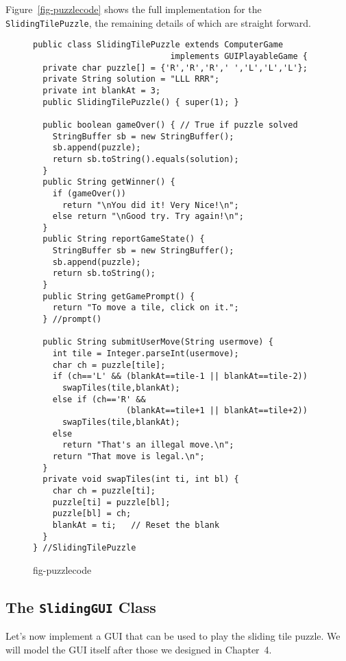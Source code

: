 Figure~\ref{fig-puzzlecode} shows the full implementation for the {\tt
SlidingTilePuzzle}, the remaining details of which are straight forward.

\begin{figure}[h!]
\jjjprogstart
\begin{jjjlisting}
\begin{lstlisting}
public class SlidingTilePuzzle extends ComputerGame 
                            implements GUIPlayableGame {
  private char puzzle[] = {'R','R','R',' ','L','L','L'};
  private String solution = "LLL RRR";
  private int blankAt = 3;
  public SlidingTilePuzzle() { super(1); }

  public boolean gameOver() { // True if puzzle solved
    StringBuffer sb = new StringBuffer();
    sb.append(puzzle);
    return sb.toString().equals(solution);    
  } 
  public String getWinner() {   
    if (gameOver())
      return "\nYou did it! Very Nice!\n";
    else return "\nGood try. Try again!\n";
  }
  public String reportGameState() {   
    StringBuffer sb = new StringBuffer();
    sb.append(puzzle);
    return sb.toString();
  } 
  public String getGamePrompt() {    
    return "To move a tile, click on it.";
  } //prompt()

  public String submitUserMove(String usermove) {   
    int tile = Integer.parseInt(usermove);
    char ch = puzzle[tile];
    if (ch=='L' && (blankAt==tile-1 || blankAt==tile-2))
      swapTiles(tile,blankAt);
    else if (ch=='R' && 
                   (blankAt==tile+1 || blankAt==tile+2))
      swapTiles(tile,blankAt);
    else 
      return "That's an illegal move.\n";
    return "That move is legal.\n";
  }
  private void swapTiles(int ti, int bl) {
    char ch = puzzle[ti];
    puzzle[ti] = puzzle[bl];
    puzzle[bl] = ch;
    blankAt = ti;   // Reset the blank
  }
} //SlidingTilePuzzle
\end{lstlisting}
\end{jjjlisting}
{fig-puzzlecode}
\end{figure}

\pagebreak
\subsection{The {\tt SlidingGUI} Class}

Let's now implement a GUI that can be used to play the sliding tile
puzzle. We will model the GUI itself after those we designed in
Chapter~4. 

